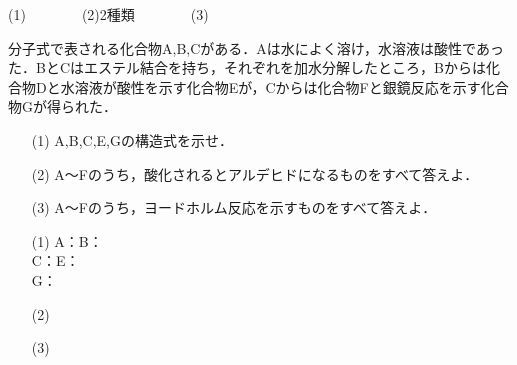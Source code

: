 \documentclass[a4paper,12pt]{ltjsreport}
\begin{document}
\ans \noindent (1)　　　　(2)2種類　　　　(3)
\newpage
\begin{que}
分子式で表される化合物A,B,Cがある．Aは水によく溶け，水溶液は酸性であった．BとCはエステル結合を持ち，それぞれを加水分解したところ，Bからは化合物Dと水溶液が酸性を示す化合物Eが，Cからは化合物Fと銀鏡反応を示す化合物Gが得られた．
\begin{itemize}
    \item [(1)]A,B,C,E,Gの構造式を示せ．
    \item [(2)]A〜Fのうち，酸化されるとアルデヒドになるものをすべて答えよ．
    \item [(3)]A〜Fのうち，ヨードホルム反応を示すものをすべて答えよ．
\end{itemize}
\end{que}
\begin{itemize}
    \item [(1)]A：\hspace{200pt}B：\\[80pt]
    C：\hspace{200pt}E：\\[80pt]
    G：\\[80pt]
    \item [(2)]　\\[15pt]
    \item [(3)]
\end{itemize}
\end{document}
